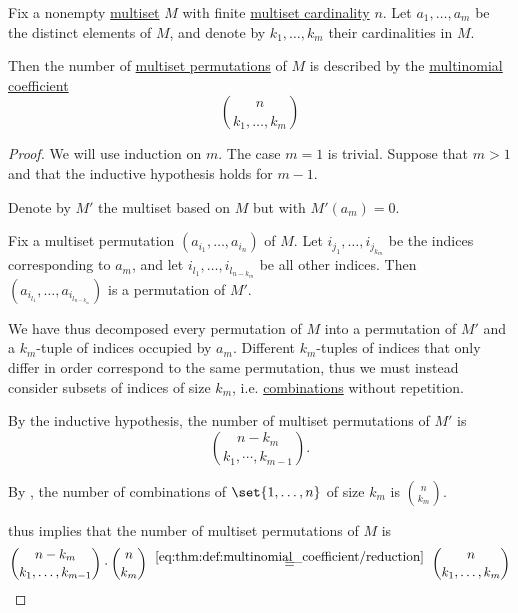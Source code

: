 \begin{proposition}\label{thm:multiset_permutation_count}
  Fix a nonempty \hyperref[def:multiset]{multiset} \( M \) with finite \hyperref[def:multiset/cardinality]{multiset cardinality} \( n \). Let \( a_1, \ldots, a_m \) be the distinct elements of \( M \), and denote by \( k_1, \ldots, k_m \) their cardinalities in \( M \).

  Then the number of \hyperref[def:multiset_permutation]{multiset permutations} of \( M \) is described by the \hyperref[def:multinomial_coefficient]{multinomial coefficient}
  \begin{equation}\label{eq:thm:multiset_permutation_count}
    \binom n {k_1, \ldots, k_m}
  \end{equation}
\end{proposition}
\begin{proof}
  We will use induction on \( m \). The case \( m = 1 \) is trivial. Suppose that \( m > 1 \) and that the inductive hypothesis holds for \( m - 1 \).

  Denote by \( M' \) the multiset based on \( M \) but with \( M'(a_m) = 0 \).

  Fix a multiset permutation \( (a_{i_1}, \ldots, a_{i_n}) \) of \( M \). Let \( i_{j_1}, \ldots, i_{j_{k_m}} \) be the indices corresponding to \( a_m \), and let \( i_{l_1}, \ldots, i_{l_{n - k_m}} \) be all other indices. Then \( (a_{i_{l_1}}, \ldots, a_{i_{l_{n - k_m}}}) \) is a permutation of \( M' \).

  We have thus decomposed every permutation of \( M \) into a permutation of \( M' \) and a \( k_m \)-tuple of indices occupied by \( a_m \). Different \( k_m \)-tuples of indices that only differ in order correspond to the same permutation, thus we must instead consider subsets of indices of size \( k_m \), i.e. \hyperref[def:combinatorial_combination]{combinations} without repetition.

  By the inductive hypothesis, the number of multiset permutations of \( M' \) is
  \begin{equation*}
    \binom {n - k_m} {k_1, \cdots, k_{m-1}}.
  \end{equation*}

  By , the number of combinations of \( \set{ 1, \ldots, n } \) of size \( k_m \) is \( \binom n {k_m} \).

   thus implies that the number of multiset permutations of \( M \) is
  \begin{equation*}
    \binom {n - k_m} {k_1, \ldots, k_{m-1}}
    \cdot
    \binom n {k_m}
    \reloset {\eqref{eq:thm:def:multinomial_coefficient/reduction}} =
    \binom n {k_1, \ldots, k_m}
  \end{equation*}
\end{proof}
